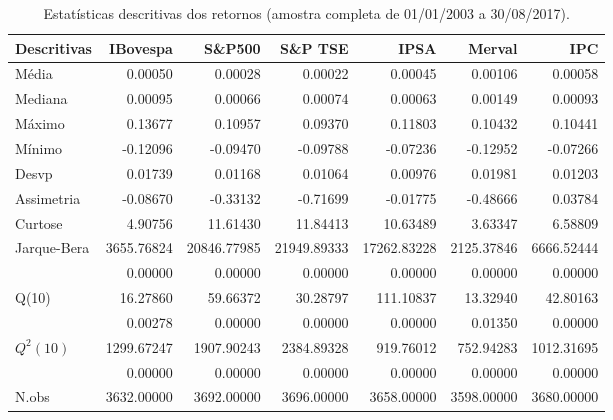 \begin{table}[H]
\centering
\caption{Estatísticas descritivas dos retornos (amostra completa de 01/01/2003 a 30/08/2017).} 
\label{tab:descritivas}
\begin{tabular}{lrrrrrr}
  \hline
Descritivas & IBovespa & S\&P500 & S\&P TSE & IPSA & Merval & IPC \\ 
  \hline
Média & 0.00050 & 0.00028 & 0.00022 & 0.00045 & 0.00106 & 0.00058 \\ 
  Mediana & 0.00095 & 0.00066 & 0.00074 & 0.00063 & 0.00149 & 0.00093 \\ 
  Máximo & 0.13677 & 0.10957 & 0.09370 & 0.11803 & 0.10432 & 0.10441 \\ 
  Mínimo & -0.12096 & -0.09470 & -0.09788 & -0.07236 & -0.12952 & -0.07266 \\ 
  Desvp & 0.01739 & 0.01168 & 0.01064 & 0.00976 & 0.01981 & 0.01203 \\ 
  Assimetria & -0.08670 & -0.33132 & -0.71699 & -0.01775 & -0.48666 & 0.03784 \\ 
  Curtose & 4.90756 & 11.61430 & 11.84413 & 10.63489 & 3.63347 & 6.58809 \\ 
  Jarque-Bera & 3655.76824 & 20846.77985 & 21949.89333 & 17262.83228 & 2125.37846 & 6666.52444 \\ 
   & 0.00000 & 0.00000 & 0.00000 & 0.00000 & 0.00000 & 0.00000 \\ 
  Q(10) & 16.27860 & 59.66372 & 30.28797 & 111.10837 & 13.32940 & 42.80163 \\ 
   & 0.00278 & 0.00000 & 0.00000 & 0.00000 & 0.01350 & 0.00000 \\ 
  $Q^2(10)$ & 1299.67247 & 1907.90243 & 2384.89328 & 919.76012 & 752.94283 & 1012.31695 \\ 
   & 0.00000 & 0.00000 & 0.00000 & 0.00000 & 0.00000 & 0.00000 \\ 
  N.obs & 3632.00000 & 3692.00000 & 3696.00000 & 3658.00000 & 3598.00000 & 3680.00000 \\ 
   \hline
\end{tabular}
\end{table}
